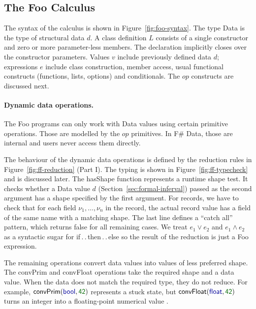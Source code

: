 \documentclass[pldi-cameraready]{sigplanconf-pldi16}
\newcommand{\kvd}[1]{\textnormal{\textcolor{kvdclr}{\sffamily #1}}}
\newcommand{\num}[1]{\textnormal{\textcolor{numclr}{\sffamily #1}}}
\newcommand{\ident}[1]{\textnormal{\sffamily #1}}
\begin{document}

\subsection{The Foo Calculus}
\label{sec:formal-ff}

The syntax of the calculus is shown in Figure~\ref{fig:foo-syntax}.
The type \ident{Data} is the type of structural data $d$. A class definition $L$ consists of
a single constructor and zero or more parameter-less members. The declaration implicitly closes
over the constructor parameters.
Values $v$ include previously defined data $d$; expressions
$e$ include class construction, member access, usual functional constructs (functions,
lists, options) and conditionals. The $op$ constructs are discussed next.


\paragraph{Dynamic data operations.}

The Foo programs can only work with \ident{Data} values using certain primitive operations. Those are modelled
by the $op$ primitives. In F\# Data, those are internal and users never access them directly.

The behaviour of the dynamic data operations is defined by the reduction rules in
Figure~\ref{fig:ff-reduction} (Part I). The typing is shown in Figure~\ref{fig:ff-typecheck} and is
discussed later. The \ident{hasShape} function represents a runtime shape test.
It checks whether a \ident{Data} value $d$ (Section~\ref{sec:formal-inferval}) passed as the second
argument has a shape specified by the first argument. For records, we have to check that for each
field $\nu_1, \ldots, \nu_n$ in the record, the actual record value has a field of the same name
with a matching shape. The last line defines a ``catch all'' pattern, which returns \kvd{false}
for all remaining cases. We treat $e_1 \vee e_2$ and $e_1 \wedge e_2$ as a syntactic sugar for
\kvd{if}\,.\,.\,\kvd{then}\,.\,.\,\kvd{else} so the result of the reduction is just a Foo
expression.

The remaining operations convert data values into values of less preferred shape.
The \ident{convPrim} and \ident{convFloat} operations take the required shape and a data value.
When the data does not match the required type, they do not reduce. For example,
$\ident{convPrim}(\kvd{bool}, \num{42})$ represents a stuck state, but $\ident{convFloat}(\kvd{float}, \num{42})$
turns an integer \num{42} into a floating-point numerical value \num{42.0}.
\end{document}
